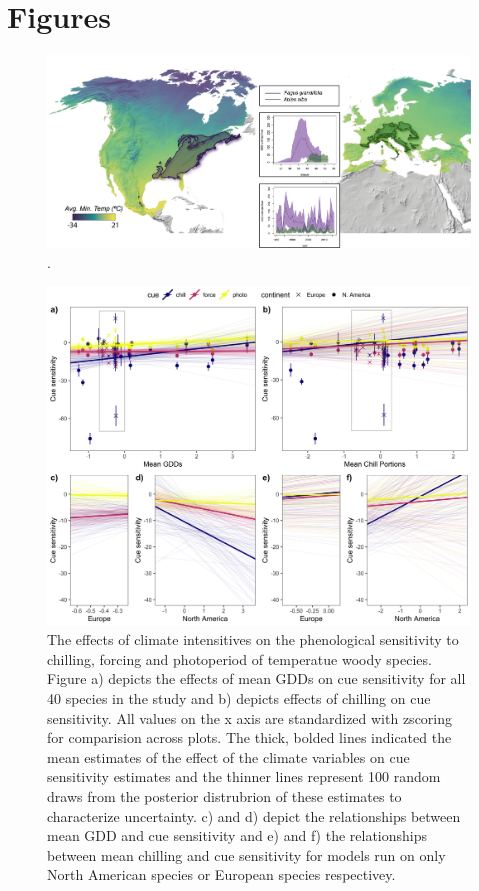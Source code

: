 \documentclass[12pt]{article}\usepackage[]{graphicx}\usepackage[]{color}
\begin{document}

\section*{Figures}

\begin{figure}[h!]
    \centering
 \includegraphics[width=\textwidth]{..//..//analyses/ranges/figures/concept figure draft2.png} 
    \caption{. }
    \label{fig:concept}
\end{figure}

\begin{figure}[h!]
    \centering
 \includegraphics[width=\textwidth]{..//..//analyses/ranges/figures/mock2.jpeg} 
    \caption{The effects of climate intensitives on the phenological sensitivity to chilling, forcing and photoperiod of temperatue woody species. Figure a) depicts the effects of mean GDDs on cue sensitivity for all 40 species in the study and b) depicts effects of chilling on cue sensitivity. All values on the x axis are standardized with zscoring for comparision across plots. The thick, bolded lines indicated the mean estimates of the effect of the climate variables on cue sensitivity estimates and the thinner lines represent 100 random draws from the posterior distrubrion of these estimates to characterize uncertainty. c) and d) depict the relationships between mean GDD and cue sensitivity and e) and f) the relationships between mean chilling and cue sensitivity for models run on only North American species or European species respectivey. }
    \label{fig:mods1}
\end{figure}
\end{document}
